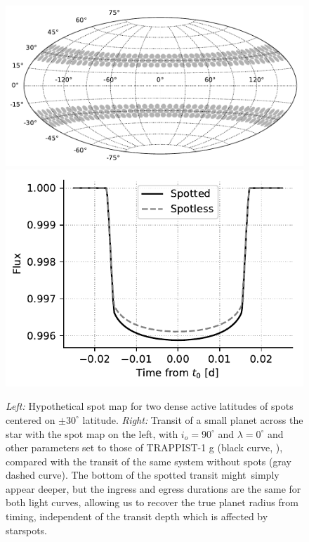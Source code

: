 \begin{figure}%
    \centering
    \includegraphics[scale=0.5]{robin/spot_map_2.pdf}
    \includegraphics[scale=0.6]{robin/transit_quad_2.pdf}
    \caption{\textsl{Left:} Hypothetical spot map for two dense active latitudes of spots centered on $\pm 30^\circ$ latitude. \textsl{Right:} Transit of a small planet across the star with the spot map on the left, with $i_o = 90^\circ$ and $\lambda = 0^\circ$ and other parameters set to those of TRAPPIST-1 g (black curve, \citealt{Delrez2018}), compared with the transit of the same system without spots (gray dashed curve). The bottom of the spotted transit might simply appear deeper, but the ingress and egress durations are the same for both light curves, allowing us to recover the true planet radius from timing, independent of the transit depth which is affected by starspots.}
    \label{fig:map2}
\end{figure}

